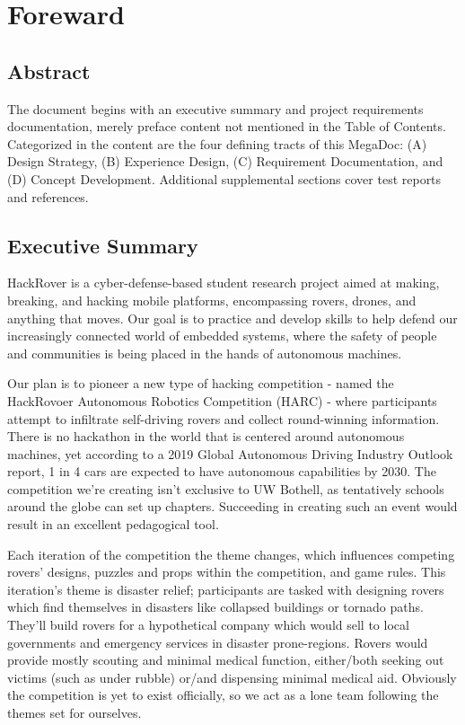 \documentclass[a4paper, 10pt]{article}
\begin{document}
\begin{titlepage}
\end{titlepage}

\pagebreak{}

\tableofcontents

\pagebreak{}

\section*{Foreward}
	\subsection*{Abstract}
	The document begins with an executive summary and project requirements documentation, merely preface content not mentioned in the Table of Contents. Categorized in the content are the four defining tracts of this MegaDoc: (A) Design Strategy, (B) Experience Design, (C) Requirement Documentation, and (D) Concept Development. Additional supplemental sections cover test reports and references.
	
	\subsection*{Executive Summary}
	HackRover is a cyber-defense-based student research project aimed at making, breaking, and hacking mobile platforms, encompassing rovers, drones, and anything that moves. Our goal is to practice and develop skills to help defend our increasingly connected world of embedded systems, where the safety of people and communities is being placed in the hands of autonomous machines.
	
	Our plan is to pioneer a new type of hacking competition - named the HackRovoer Autonomous Robotics Competition (HARC) - where participants attempt to infiltrate self-driving rovers and collect round-winning information. There is no hackathon in the world that is centered around autonomous machines, yet according to a 2019 Global Autonomous Driving Industry Outlook report, 1 in 4 cars are expected to have autonomous capabilities by 2030. The competition we're creating isn't exclusive to UW Bothell, as tentatively schools around the globe can set up chapters. Succeeding in creating such an event would result in an excellent pedagogical tool. 
	
	Each iteration of the competition the theme changes, which influences competing rovers' designs, puzzles and props within the competition, and game rules. This iteration's theme is disaster relief; participants are tasked with designing rovers which find themselves in disasters like collapsed buildings or tornado paths. They'll build rovers for a hypothetical company which would sell to local governments and emergency services in disaster prone-regions. Rovers would provide mostly scouting and minimal medical function, either/both seeking out victims (such as under rubble) or/and dispensing minimal medical aid. Obviously the competition is yet to exist officially, so we act as a lone team following the themes set for ourselves. 
	
\end{document}
